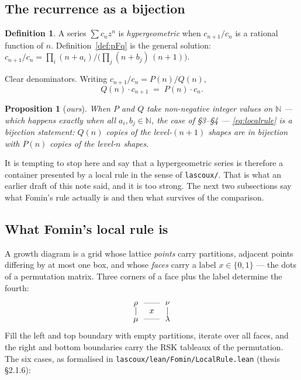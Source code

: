 \documentclass[11pt,a4paper]{article}
\newtheorem{proposition}[theorem]{Proposition}
\theoremstyle{definition}
\newtheorem{definition}[theorem]{Definition}
\theoremstyle{remark}
\newcommand{\NN}{\mathbb{N}}
\begin{document}
\subsection{The recurrence as a bijection}

\begin{definition}\label{def:hyp}
A series $\sum c_n z^n$ is \emph{hypergeometric} when $c_{n+1}/c_n$ is a rational
function of $n$. Definition~\ref{def:pFq} is the general solution:
$c_{n+1}/c_n = \prod_i(n+a_i)\big/\bigl(\prod_j(n+b_j)\,(n+1)\bigr)$.
\end{definition}

Clear denominators. Writing $c_{n+1}/c_n = P(n)/Q(n)$,
\begin{equation}\label{eq:localrule}
  Q(n)\cdot c_{n+1} \;=\; P(n)\cdot c_n .
\end{equation}

\begin{proposition}[\emph{ours}]\label{prop:localrule}
When $P$ and $Q$ take non-negative integer values on $\NN$ --- which happens exactly
when all $a_i, b_j \in \NN$, the case of \S3--\S4 --- \eqref{eq:localrule} is a
bijection statement: $Q(n)$ copies of the level-$(n+1)$ shapes are in bijection with
$P(n)$ copies of the level-$n$ shapes.
\end{proposition}

It is tempting to stop here and say that a hypergeometric series is therefore a
container presented by a local rule in the sense of \texttt{lascoux/}. That is what an
earlier draft of this note said, and it is too strong. The next two subsections say
what Fomin's rule actually is and then what survives of the comparison.

\subsection{What Fomin's local rule is}

A growth diagram is a grid whose lattice \emph{points} carry partitions, adjacent
points differing by at most one box, and whose \emph{faces} carry a label
$x \in \{0,1\}$ --- the dots of a permutation matrix. Three corners of a face plus the
label determine the fourth:
\[
\begin{array}{ccc}
 \rho & \!\!\text{\textemdash\textemdash}\!\! & \nu \\[-0.2em]
 \mid & x & \mid \\[-0.2em]
 \mu & \!\!\text{\textemdash\textemdash}\!\! & \lambda
\end{array}
\]
Fill the left and top boundary with empty partitions, iterate over all faces, and the
right and bottom boundaries carry the RSK tableaux of the permutation. The six cases,
as formalised in \texttt{lascoux/lean/Fomin/LocalRule.lean} (thesis \S2.1.6):
\end{document}
